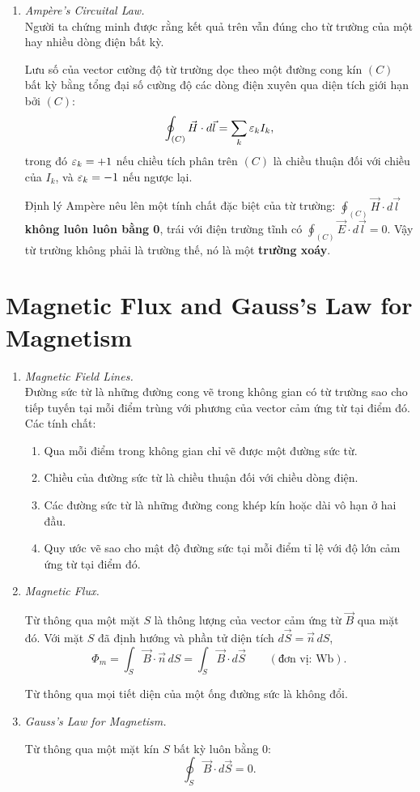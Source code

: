\begin{enumerate}
\item \textit{Ampère's Circuital Law.}\\
Người ta chứng minh được rằng kết quả trên vẫn đúng cho từ trường của một hay nhiều dòng điện bất kỳ.
\begin{theorem}[Ampère]
Lưu số của vector cường độ từ trường dọc theo một đường cong kín $(C)$ bất kỳ bằng tổng đại số cường độ các dòng điện xuyên qua diện tích giới hạn bởi $(C)$:
\[
\oint_{(C)} \vec{H}\cdot d\vec{l} = \sum_k \varepsilon_k I_k,
\]
trong đó $\varepsilon_k = +1$ nếu chiều tích phân trên $(C)$ là chiều thuận đối với chiều của $I_k$, và $\varepsilon_k = -1$ nếu ngược lại.
\end{theorem}
Định lý Ampère nêu lên một tính chất đặc biệt của từ trường: $\oint_{(C)} \vec{H}\cdot d\vec{l}$ \textbf{không luôn luôn bằng 0}, trái với điện trường tĩnh có $\oint_{(C)} \vec{E}\cdot d\vec{l} = 0$. Vậy từ trường không phải là trường thế, nó là một \textbf{trường xoáy}.
\end{enumerate}

\section{Magnetic Flux and Gauss's Law for Magnetism}
\begin{enumerate}
\item \textit{Magnetic Field Lines.}\\
Đường sức từ là những đường cong vẽ trong không gian có từ trường sao cho tiếp tuyến tại mỗi điểm trùng với phương của vector cảm ứng từ tại điểm đó. Các tính chất:
\begin{enumerate}
  \item[(a)] Qua mỗi điểm trong không gian chỉ vẽ được một đường sức từ.
  \item[(b)] Chiều của đường sức từ là chiều thuận đối với chiều dòng điện.
  \item[(c)] Các đường sức từ là những đường cong khép kín hoặc dài vô hạn ở hai đầu.
  \item[(d)] Quy ước vẽ sao cho mật độ đường sức tại mỗi điểm tỉ lệ với độ lớn cảm ứng từ tại điểm đó.
\end{enumerate}

\item \textit{Magnetic Flux.}\\
\begin{definition}
Từ thông qua một mặt $S$ là thông lượng của vector cảm ứng từ $\vec{B}$ qua mặt đó. Với mặt $S$ đã định hướng và phần tử diện tích $d\vec{S} = \vec{n}\,dS$,
\[
\Phi_m = \int_S \vec{B}\cdot\vec{n}\,dS = \int_S \vec{B}\cdot d\vec{S} \qquad (\text{đơn vị: Wb}).
\]
\end{definition}
Từ thông qua mọi tiết diện của một ống đường sức là không đổi.

\item \textit{Gauss's Law for Magnetism.}\\
\begin{theorem}[Gauss]
Từ thông qua một mặt kín $S$ bất kỳ luôn bằng 0:
\[
\oint_S \vec{B}\cdot d\vec{S} = 0.
\]
\end{theorem}
\end{enumerate}

